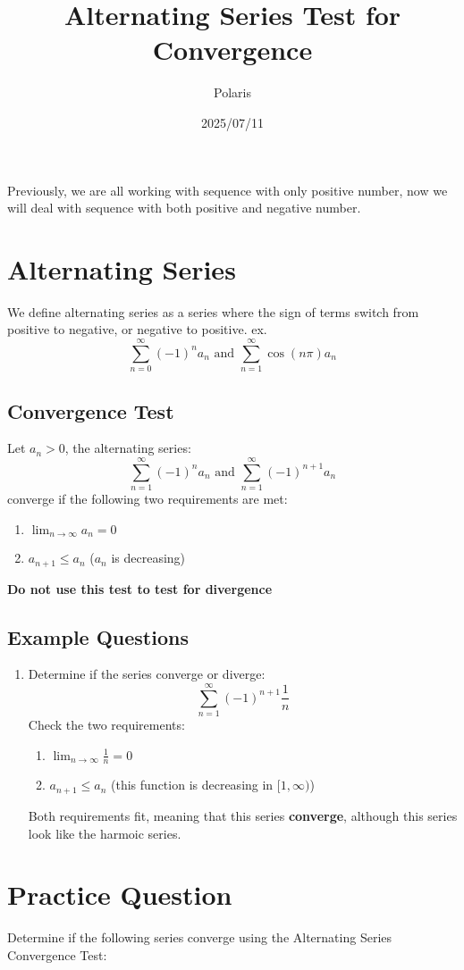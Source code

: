 \documentclass{article}
\title{Alternating Series Test for Convergence}
\author{Polaris}
\date{2025/07/11}
\numberwithin{equation}{section}
\begin{document}
\maketitle
Previously, we are all working with sequence with only positive number, now we will deal with sequence with both positive and negative number.

\section{Alternating Series}
We define alternating series as a series where the sign of terms switch from positive to negative, or negative to positive.
ex.
\[
    \sum_{n = 0}^{\infty} (-1)^n a_n \text{ and } \sum_{n = 1}^{\infty} \cos(n\pi) a_n
\]

\subsection{Convergence Test}
Let $a_n > 0$, the alternating series:
\[
    \sum_{n = 1}^{\infty} (-1)^n a_n \text{ and } \sum_{n = 1}^{\infty} (-1)^{n+1} a_n
\]
converge if the following two requirements are met:
\begin{enumerate}
    \item $\lim_{n\to \infty} a_n = 0$
    \item $a_{n+1} \leq a_n$ ($a_n$ is decreasing)
\end{enumerate}
\textbf{Do not use this test to test for divergence}

\subsection{Example Questions}
\begin{enumerate}
    \item Determine if the series converge or diverge:
    \[
        \sum_{n = 1}^{\infty} (-1)^{n+1}\frac{1}{n}
    \]
    Check the two requirements:
    \begin{enumerate}
        \item $\lim_{n\to\infty} \frac{1}{n} = 0$
        \item $a_{n+1} \leq a_n$ (this function is decreasing in $[1,\infty)$)
    \end{enumerate}
    Both requirements fit, meaning that this series \textbf{converge}, although this series look like the harmoic series.
\end{enumerate}

\newpage
\section{Practice Question}
Determine if the following series converge using the Alternating Series Convergence Test:
\end{document}

